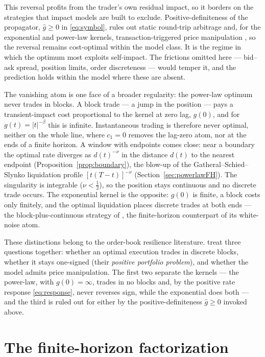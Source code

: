 \documentclass[11pt]{article}
\theoremstyle{plain}
\theoremstyle{definition}
\theoremstyle{remark}
\begin{document}
This reversal profits from the trader's own residual impact, so it borders on the strategies that impact models are built to exclude. Positive-definiteness of the propagator, $\hat g\ge0$ in \eqref{eq:symbol}, rules out static round-trip arbitrage and, for the exponential and power-law kernels, transaction-triggered price manipulation \citep{Gatheral2010,AlfonsiSchiedSlynko2012}, so the reversal remains cost-optimal within the model class. It is the regime in which the optimum most exploits self-impact. The frictions omitted here --- bid--ask spread, position limits, order discreteness --- would temper it, and the prediction holds within the model where these are absent.

The vanishing atom is one face of a broader regularity: the power-law optimum never trades in blocks. A block trade --- a jump in the position --- pays a transient-impact cost proportional to the kernel at zero lag, $g(0)$, and for $g(t)=|t|^{-\beta}$ this is infinite. Instantaneous trading is therefore never optimal, neither on the whole line, where $c_1=0$ removes the lag-zero atom, nor at the ends of a finite horizon. A window with endpoints comes close: near a boundary the optimal rate diverges as $d(t)^{-\nu}$ in the distance $d(t)$ to the nearest endpoint (Proposition~\ref{prop:boundary}), the blow-up of the Gatheral--Schied--Slynko liquidation profile $[t(T-t)]^{-\nu}$ (Section~\ref{sec:powerlawFH}). The singularity is integrable ($\nu<\tfrac12$), so the position stays continuous and no discrete trade occurs. The exponential kernel is the opposite: $g(0)$ is finite, a block costs only finitely, and the optimal liquidation places discrete trades at both ends --- the block-plus-continuous strategy of \citet{ObizhaevaWang2013}, the finite-horizon counterpart of its white-noise atom.

These distinctions belong to the order-book resilience literature. \citet{AlfonsiSchiedSlynko2012} treat three questions together: whether an optimal execution trades in discrete blocks, whether it stays one-signed (their \emph{positive portfolio problem}), and whether the model admits price manipulation. The first two separate the kernels --- the power-law, with $g(0)=\infty$, trades in no blocks and, by the positive rate response \eqref{eq:response}, never reverses sign, while the exponential does both --- and the third is ruled out for either by the positive-definiteness $\hat g\ge0$ invoked above.

\section{The finite-horizon factorization}\label{sec:boundary}
\end{document}
